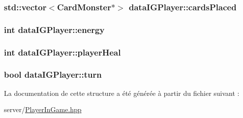 \subsubsection[{cards\+Placed}]{\setlength{\rightskip}{0pt plus 5cm}std\+::vector$<${\bf Card\+Monster}$\ast$$>$ data\+I\+G\+Player\+::cards\+Placed}\label{structdataIGPlayer_a32709b71453d54100f95fae5535c0cb5}
\hypertarget{structdataIGPlayer_a62d62c03941a981f96ae02098ae8d2e2}{}
\subsubsection[{energy}]{\setlength{\rightskip}{0pt plus 5cm}int data\+I\+G\+Player\+::energy}\label{structdataIGPlayer_a62d62c03941a981f96ae02098ae8d2e2}
\hypertarget{structdataIGPlayer_addf0349de6577e21e1697b0853f37afb}{}
\subsubsection[{player\+Heal}]{\setlength{\rightskip}{0pt plus 5cm}int data\+I\+G\+Player\+::player\+Heal}\label{structdataIGPlayer_addf0349de6577e21e1697b0853f37afb}
\hypertarget{structdataIGPlayer_a42cbe10f46e1e6bbd514e624cf6e1526}{}
\subsubsection[{turn}]{\setlength{\rightskip}{0pt plus 5cm}bool data\+I\+G\+Player\+::turn}\label{structdataIGPlayer_a42cbe10f46e1e6bbd514e624cf6e1526}


La documentation de cette structure a été générée à partir du fichier suivant \+:\begin{DoxyCompactItemize}
\item 
server/\hyperlink{PlayerInGame_8hpp}{Player\+In\+Game.\+hpp}\end{DoxyCompactItemize}
